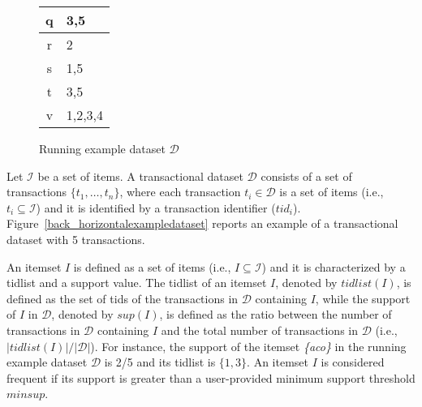 \begin{figure}[!t]
{{\begin{tabular}{|c|l|}
	q & 3,5 \\ \hline
	r & 2 \\ \hline
	s & 1,5 \\ \hline
	t & 3,5 \\ \hline
	v & 1,2,3,4 \\ \hline
\end{tabular}}}%
\caption{Running example dataset $\mathcal{D}$}
\label{back_exampledataset}
\end{figure}

Let $\mathcal{I}$ be a set of items. A transactional dataset $\mathcal{D}$
consists of a set of transactions $\{t_1, \dots, t_n\}$,
where each transaction $t_i\in \mathcal{D}$ is a set of items (i.e.,
$t_i\subseteq \mathcal{I}$)
and it is identified by a transaction identifier ($tid_i$).
Figure~\ref{back_horizontalexampledataset} reports an example of a transactional
dataset with 5 transactions.

An itemset $I$ is defined as a set of items (i.e., $I\subseteq\mathcal{I}$) and
it is characterized by a tidlist and a support value.
The tidlist of an itemset $I$, denoted by $tidlist(I)$, is defined as the set of
tids of the transactions in $\mathcal{D}$ containing $I$,
while the support of $I$ in $\mathcal{D}$, denoted by $sup(I)$, is defined as
the ratio between the number of transactions in $\mathcal{D}$ containing $I$
and the total number of transactions in $\mathcal{D}$ (i.e.,
$|tidlist(I)|/|\mathcal{D}|$).
For instance, the support of the itemset \textit{\{aco\}} in
the running example dataset $\mathcal{D}$ is 2/5 and its tidlist is $\{1,3\}$.
An itemset $I$ is considered frequent if its support is greater than a
user-provided minimum support threshold $minsup$.

